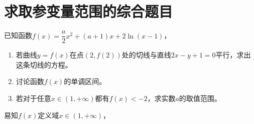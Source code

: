 \section{求取参变量范围的综合题目}
\begin{que}
	已知函数$f(x)=\dfrac{a}{2}x^2+(a+1)x+2\ln(x-1)$，
	\begin{enumerate}
		\item 若曲线$y=f(x)$在点$(2,f(2))$处的切线与直线$2x-y+1=0$平行，求出这条切线的方程。
		\item 讨论函数$f(x)$的单调区间。
		\item 若对于任意$x\in(1,+\infty)$都有$f(x)<-2$，求实数$a$的取值范围。
	\end{enumerate}
\end{que}
\sol 易知$f(x)$定义域$x\in (1,+\infty)$，

